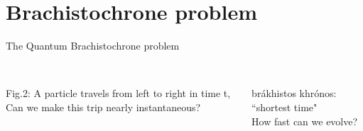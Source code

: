 \documentclass[10pt]{beamer}
\begin{document}
\section{Brachistochrone problem}
\begin{frame}{The Quantum Brachistochrone problem}
\vspace{0.5cm}
\begin{columns}
    \hspace{1.5em}
    \begin{column}{\textwidth}
    \\
    \hspace{1em}
    \tiny{Fig.2:
    A particle travels from left to right in time t,\\
    \hspace{2.4em}
    Can we make this trip nearly instantaneous?}
    \end{column}
    
    \hspace{-15em}
    \begin{column}{0.5\textwidth}
    \\
        brákhistos khrónos:\\
        ``shortest time"\\
    \vspace{1cm}
    \pause
    \small{\textcolor{myNewColorC}{How fast can we evolve?}
    }
    \end{column}
    \end{columns}
\end{frame}
\end{document}
